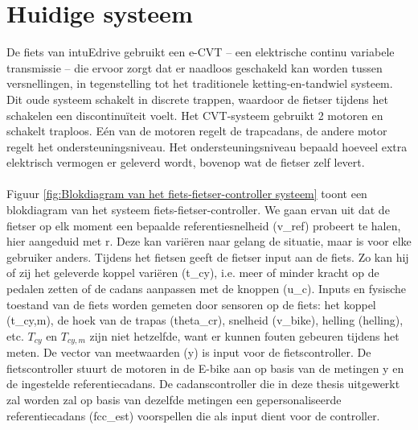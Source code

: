 \documentclass[12pt,a4paper,oneside]{book}
\begin{document}
\section{Huidige systeem}
De fiets van intuEdrive gebruikt een e-CVT – een elektrische continu variabele transmissie – die ervoor zorgt dat er naadloos geschakeld kan worden tussen versnellingen, in tegenstelling tot het traditionele ketting-en-tandwiel systeem. Dit oude systeem schakelt in discrete trappen, waardoor de fietser tijdens het schakelen een discontinuïteit voelt. Het CVT-systeem gebruikt 2 motoren en schakelt traploos. Eén van de motoren regelt de trapcadans, de andere motor regelt het ondersteuningsniveau. Het ondersteuningsniveau bepaald hoeveel extra elektrisch vermogen er geleverd wordt, bovenop wat de fietser zelf levert.
\\\\
Figuur \ref{fig:Blokdiagram van het fiets-fietser-controller systeem} toont een blokdiagram van het systeem fiets-fietser-controller. We gaan ervan uit dat de fietser op elk moment een bepaalde referentiesnelheid (\gls{v_ref}) probeert te halen, hier aangeduid met r. Deze kan variëren naar gelang de situatie, maar is voor elke gebruiker anders. Tijdens het fietsen geeft de fietser input aan de fiets. Zo kan hij of zij het geleverde koppel variëren (\gls{t_cy}), i.e. meer of minder kracht op de pedalen zetten of de cadans aanpassen met de knoppen (\gls{u_c}). Inputs en fysische toestand van de fiets worden gemeten door sensoren op de fiets: het koppel (\gls{t_cy,m}), de hoek van de trapas (\gls{theta_cr}), snelheid (\gls{v_bike}), helling (\gls{helling}), etc. $T_{cy}$ en $T_{cy,m}$ zijn niet hetzelfde, want er kunnen fouten gebeuren tijdens het meten. De vector van meetwaarden (\gls{y}) is input voor de fietscontroller. De fietscontroller stuurt de motoren in de E-bike aan op basis van de metingen \gls{y} en de ingestelde referentiecadans. De cadanscontroller die in deze thesis uitgewerkt zal worden zal op basis van dezelfde metingen een gepersonaliseerde referentiecadans (\gls{fcc_est}) voorspellen die als input dient voor de controller.
\end{document}
